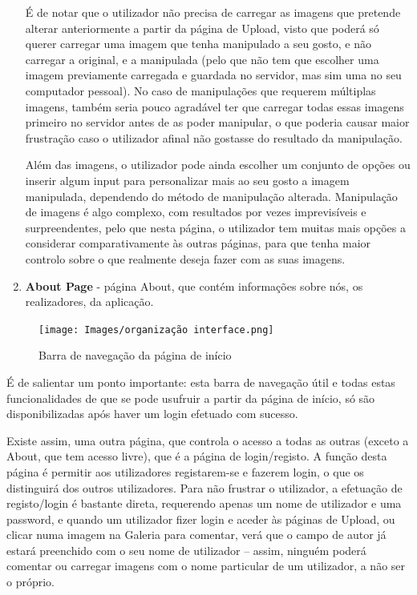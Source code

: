 \documentclass{report}
\begin{document}
\begin{enumerate}
     É de notar que o utilizador não precisa de carregar as imagens que pretende alterar anteriormente a partir da página de Upload, visto que poderá só querer carregar uma imagem que tenha manipulado a seu gosto, e não carregar a original, e a manipulada (pelo que não tem que escolher uma imagem previamente carregada e guardada no servidor, mas sim uma no seu computador pessoal). No caso de manipulações que requerem múltiplas imagens, também seria pouco agradável ter que carregar todas essas imagens primeiro no servidor antes de as poder manipular, o que poderia causar maior frustração caso o utilizador afinal não gostasse do resultado da manipulação.
\linebreak
   
     Além das imagens, o utilizador pode ainda escolher um conjunto de opções ou inserir algum input para personalizar mais ao seu gosto a imagem manipulada, dependendo do método de manipulação alterada. Manipulação de imagens é algo complexo, com resultados por vezes imprevisíveis e surpreendentes, pelo que nesta página, o utilizador tem muitas mais opções a considerar comparativamente às outras páginas, para que tenha maior controlo sobre o que realmente deseja fazer com as suas imagens.

    \item \textbf{About Page}
    - página About, que contém informações sobre nós, os realizadores, da aplicação. 
\end{enumerate}

\newpage


\begin{figure}[!hbtp]
        \centering 
        \texttt{[image: Images/organização interface.png]}
        \caption{\label{Estrutura}Barra de navegação da página de início}
    \end{figure}

É de salientar um ponto importante: esta barra de navegação útil e todas estas funcionalidades de que se pode usufruir a partir da página de início, só são disponibilizadas após haver um login efetuado com sucesso.

\linebreak
\bigskip

Existe assim, uma outra página, que controla o acesso a todas as outras (exceto a About, que tem acesso livre), que é a página de login/registo. A função desta página é permitir aos utilizadores registarem-se e fazerem login, o que os distinguirá dos outros utilizadores.
	Para não frustrar o utilizador, a efetuação de registo/login é bastante direta, requerendo apenas um nome de utilizador e uma password, e quando um utilizador fizer login e aceder às páginas de Upload, ou clicar numa imagem na Galeria para comentar, verá que o campo de autor já estará preenchido com o seu nome de utilizador – assim, ninguém poderá comentar ou carregar imagens com o nome particular de um utilizador, a não ser o próprio.   
\end{document}
